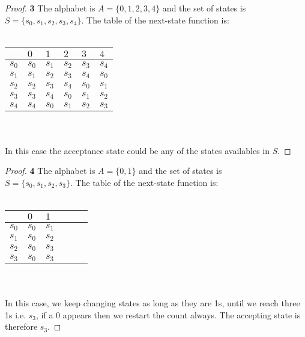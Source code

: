\documentclass[11pt]{article}
\begin{document}
\cleardoublepage
		\begin{proof}{\textbf{3}}
			The alphabet is $A = \{0,1,2,3,4\}$ and the set of states is \\$S = \{s_0,s_1,s_2,s_3,s_4\}$. The table of the next-state function is: \\\\
			\begin{adjustbox}{max width=\textwidth,center}
			\begin{tabular}{l|lllll}
				      & $0$   & $1$   & $2$   & $3$   & $4$ \\ \hline
				$s_0$ & $s_0$ & $s_1$ & $s_2$ & $s_3$ & $s_4$ \\
				$s_1$ & $s_1$ & $s_2$ & $s_3$ & $s_4$ & $s_0$ \\
				$s_2$ & $s_2$ & $s_3$ & $s_4$ & $s_0$ & $s_1$ \\
				$s_3$ & $s_3$ & $s_4$ & $s_0$ & $s_1$ & $s_2$ \\
				$s_4$ & $s_4$ & $s_0$ & $s_1$ & $s_2$ & $s_3$
			\end{tabular}
			\end{adjustbox}\\\\
			In this case the acceptance state could be any of the states availables in $S$.
		\end{proof}
		\begin{proof}{\textbf{4}}
			The alphabet is $A = \{0,1\}$ and the set of states is \\$S = \{s_0,s_1,s_2,s_3\}$. The table of the next-state function is: \\\\
			\begin{adjustbox}{max width=\textwidth,center}
			\begin{tabular}{l|lllll}
				      & $0$   & $1$   \\ \hline
				$s_0$ & $s_0$ & $s_1$ \\
				$s_1$ & $s_0$ & $s_2$ \\
				$s_2$ & $s_0$ & $s_3$ \\
				$s_3$ & $s_0$ & $s_3$ \\ 
			\end{tabular}
			\end{adjustbox}\\\\
			In this case, we keep changing states as long as they are 1s, until we reach three 1s i.e. $s_3$, if a 0 appears then we restart the count always.
			The accepting state is therefore $s_3$.
		\end{proof}
\end{document}
